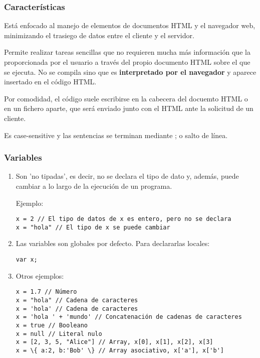 \documentclass{apuntes}
\begin{document}
\subsubsection{Características}
Está enfocado al manejo de elementos de documentos HTML y el navegador web, minimizando el trasiego de datos entre el cliente y el servidor.

Permite realizar tareas sencillas que no requieren mucha más información que la proporcionada por el usuario a través del propio documento HTML sobre el que se ejecuta. No se compila sino que es \textbf{interpretado por el navegador} y aparece insertado en el código HTML.

Por comodidad, el código suele escribirse en la cabecera del docuemto HTML o en un fichero aparte, que será enviado junto con el HTML ante la solicitud de un cliente.

Es case-sensitive y las sentencias se terminan mediante ; o salto de línea.
\subsubsection{Variables}
\begin{enumerate}
\item Son 'no tipadas', es decir, no se declara el tipo de dato y, además, puede cambiar a lo largo de la ejecución de un programa.

Ejemplo:

\begin{verbatim}
x = 2 // El tipo de datos de x es entero, pero no se declara
x = "hola" // El tipo de x se puede cambiar
\end{verbatim}
\item Las variables son globales por defecto. Para declararlas locales:
\begin{verbatim}
var x;
 \end{verbatim}
\item Otros ejemplos:

\begin{verbatim}
x = 1.7 // Número
x = "hola" // Cadena de caracteres
x = 'hola' // Cadena de caracteres
x = 'hola ' + 'mundo' // Concatenación de cadenas de caracteres
x = true // Booleano
x = null // Literal nulo
x = [2, 3, 5, "Alice"] // Array, x[0], x[1], x[2], x[3]
x = \{ a:2, b:'Bob' \} // Array asociativo, x['a'], x['b']
\end{verbatim}
\end{enumerate}
\end{document}
